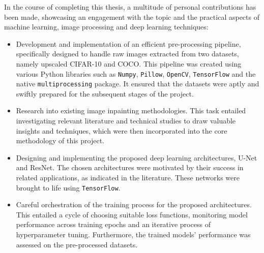 In the course of completing this thesis, a multitude of personal contributions has been made, showcasing an engagement with the topic and the practical aspects of machine learning, image processing and deep learning techniques:
\begin{itemize}[leftmargin=1.5em]
    \setlength\itemsep{0.2cm}

    \item Development and implementation of an efficient pre-processing pipeline, specifically designed to handle raw images extracted from two datasets, namely upscaled CIFAR-10 and COCO. This pipeline was created using various Python libraries such as \texttt{Numpy}, \texttt{Pillow}, \texttt{OpenCV}, \texttt{TensorFlow} and the native \texttt{multiprocessing} package. It ensured that the datasets were aptly and swiftly prepared for the subsequent stages of the project.

    \item Research into existing image inpainting methodologies. This task entailed investigating relevant literature and technical studies to draw valuable insights and techniques, which were then incorporated into the core methodology of this project.

    \item Designing and implementing the proposed deep learning architectures, U-Net and ResNet. The chosen architectures were motivated by their success in related applications, as indicated in the literature. These networks were brought to life using \texttt{TensorFlow}.

    \item Careful orchestration of the training process for the proposed architectures. This entailed a cycle of choosing suitable loss functions, monitoring model performance across training epochs and an iterative process of hyperparameter tuning. Furthermore, the trained models' performance was assessed on the pre-processed datasets.
\end{itemize}


